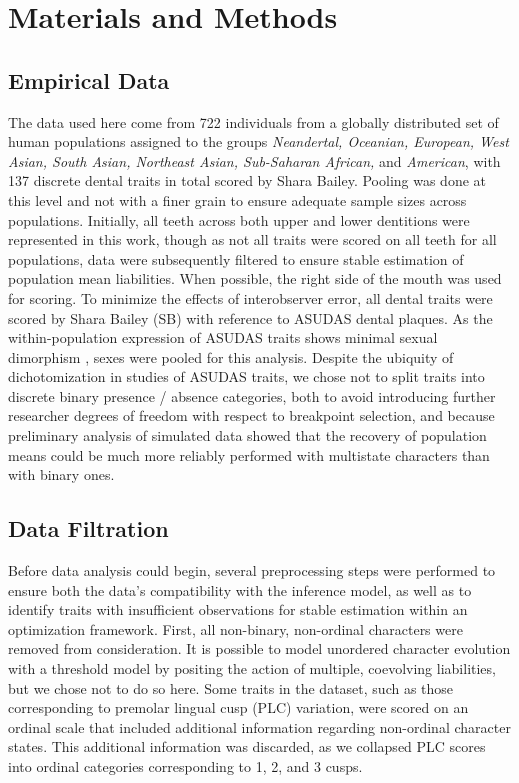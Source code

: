 \documentclass[10pt, twocolumn, twoside]{article}
\begin{document}
\clearpage

\section{Materials and Methods}


\subsection{Empirical Data}

The data used here come from 722 individuals from a globally distributed set of human populations assigned to the groups \textit{Neandertal, Oceanian, European, West Asian, South Asian, Northeast Asian, Sub-Saharan African,} and \textit{American}, with 137 discrete dental traits in total scored by Shara Bailey. Pooling was done at this level and not with a finer grain to ensure adequate sample sizes across populations. Initially, all teeth across both upper and lower dentitions were represented in this work, though as not all traits were scored on all teeth for all populations, data were subsequently filtered to ensure stable estimation of population mean liabilities. When possible, the right side of the mouth was used for scoring. To minimize the effects of interobserver error, all dental traits were scored by Shara Bailey (SB) with reference to ASUDAS dental plaques. As the within-population expression of ASUDAS traits shows minimal sexual dimorphism \citep{scottAnthropologyModernHuman2018}, sexes were pooled for this analysis. Despite the ubiquity of dichotomization in studies of ASUDAS traits, we chose not to split traits into discrete binary presence / absence categories, both to avoid introducing further researcher degrees of freedom with respect to breakpoint selection, and because preliminary analysis of simulated data showed that the recovery of population means could be much more reliably performed with multistate characters than with binary ones.

\subsection{Data Filtration}

Before data analysis could begin, several preprocessing steps were performed to ensure both the data's compatibility with the inference model, as well as to identify traits with insufficient observations for stable estimation within an optimization framework. First, all non-binary, non-ordinal characters were removed from consideration. It is possible to model unordered character evolution with a threshold model by positing the action of multiple, coevolving liabilities, but we chose not to do so here. Some traits in the dataset, such as those corresponding to premolar lingual cusp (PLC) variation, were scored on an ordinal scale that included additional information regarding non-ordinal character states. This additional information was discarded, as we collapsed PLC scores into ordinal categories corresponding to 1, 2, and 3 cusps.
\end{document}
